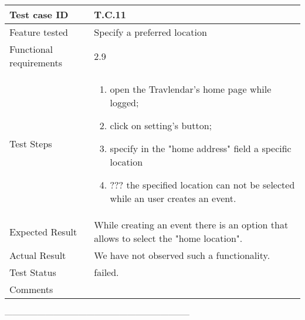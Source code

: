 \begin{table}[H]
	\begin{center}
		\begin{tabular}{ | p{} | p{} | }
		\hline
		Test case ID & T.C.11\\
		\hline
		Feature tested & Specify a preferred location\\
		\hline
		Functional requirements & 2.9\\
		\hline
		Test Steps & 
			\begin{enumerate}
				\item open the Travlendar's home page while logged;
				\item click on setting's button;
				\item specify in the "home address" field a specific location
				\item ??? the specified location can not be selected while an user creates an event.
			\end{enumerate} \\
		\hline
		Expected Result & While creating an event there is an option that allows to select the "home location".\\
		\hline
		Actual Result & We have not observed such a functionality.\\ 
		\hline
		Test Status & \color{Red}failed.\\ 
		\hline
		Comments &\\ 
		\hline
		\end{tabular}
	\end{center}
\end{table}

--------------------------------------------------------------------

